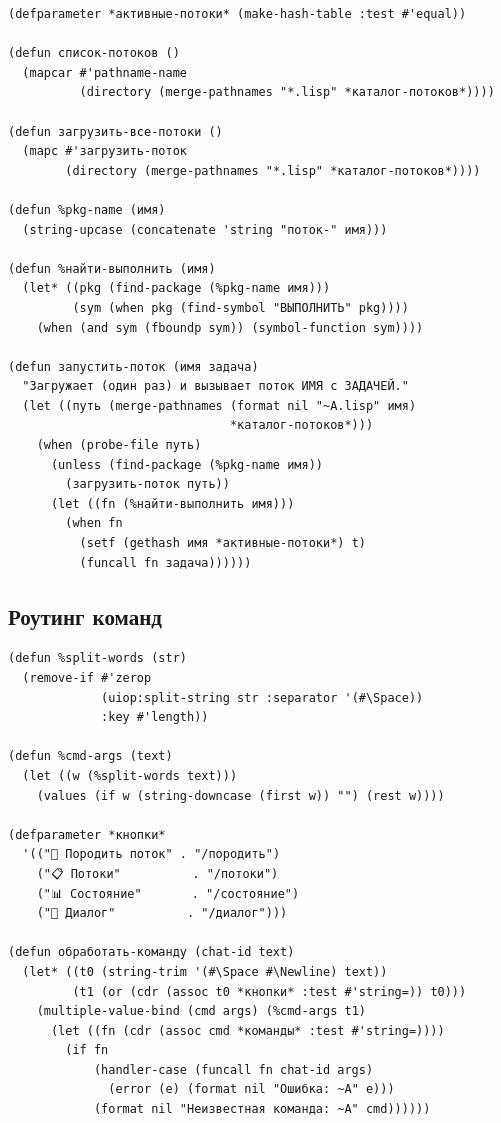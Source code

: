 \documentclass[11pt,a4paper]{article}
\begin{document}
\begin{lstlisting}[caption={мастер/cl/потоки.lisp}]
(defparameter *активные-потоки* (make-hash-table :test #'equal))

(defun список-потоков ()
  (mapcar #'pathname-name
          (directory (merge-pathnames "*.lisp" *каталог-потоков*))))

(defun загрузить-все-потоки ()
  (mapc #'загрузить-поток
        (directory (merge-pathnames "*.lisp" *каталог-потоков*))))

(defun %pkg-name (имя)
  (string-upcase (concatenate 'string "поток-" имя)))

(defun %найти-выполнить (имя)
  (let* ((pkg (find-package (%pkg-name имя)))
         (sym (when pkg (find-symbol "ВЫПОЛНИТЬ" pkg))))
    (when (and sym (fboundp sym)) (symbol-function sym))))

(defun запустить-поток (имя задача)
  "Загружает (один раз) и вызывает поток ИМЯ с ЗАДАЧЕЙ."
  (let ((путь (merge-pathnames (format nil "~A.lisp" имя)
                               *каталог-потоков*)))
    (when (probe-file путь)
      (unless (find-package (%pkg-name имя))
        (загрузить-поток путь))
      (let ((fn (%найти-выполнить имя)))
        (when fn
          (setf (gethash имя *активные-потоки*) t)
          (funcall fn задача))))))
\end{lstlisting}

\subsection{Роутинг команд}

\begin{lstlisting}[caption={мастер/cl/команды.lisp — парсинг и роутинг}]
(defun %split-words (str)
  (remove-if #'zerop
             (uiop:split-string str :separator '(#\Space))
             :key #'length))

(defun %cmd-args (text)
  (let ((w (%split-words text)))
    (values (if w (string-downcase (first w)) "") (rest w))))

(defparameter *кнопки*
  '(("🔧 Породить поток" . "/породить")
    ("📋 Потоки"          . "/потоки")
    ("📊 Состояние"       . "/состояние")
    ("💬 Диалог"          . "/диалог")))

(defun обработать-команду (chat-id text)
  (let* ((t0 (string-trim '(#\Space #\Newline) text))
         (t1 (or (cdr (assoc t0 *кнопки* :test #'string=)) t0)))
    (multiple-value-bind (cmd args) (%cmd-args t1)
      (let ((fn (cdr (assoc cmd *команды* :test #'string=))))
        (if fn
            (handler-case (funcall fn chat-id args)
              (error (e) (format nil "Ошибка: ~A" e)))
            (format nil "Неизвестная команда: ~A" cmd))))))
\end{lstlisting}
\end{document}
